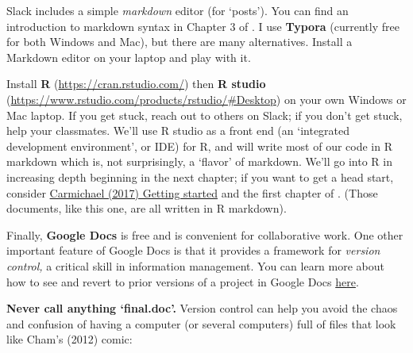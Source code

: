 \documentclass[openany]{book}
\begin{document}
Slack includes a simple \emph{markdown} editor (for `posts'). You can find an introduction to markdown syntax in Chapter 3 of \citet{freeman2017informatics}. I use \textbf{Typora} (currently free for both Windows and Mac), but there are many alternatives. Install a Markdown editor on your laptop and play with it.

Install \textbf{R} (\url{https://cran.rstudio.com/}) then \textbf{R studio} (\url{https://www.rstudio.com/products/rstudio/\#Desktop}) on your own Windows or Mac laptop. If you get stuck, reach out to others on Slack; if you don't get stuck, help your classmates. We'll use R studio as a front end (an `integrated development environment', or IDE) for R, and will write most of our code in R markdown which is, not surprisingly, a `flavor' of markdown. We'll go into R in increasing depth beginning in the next chapter; if you want to get a head start, consider \href{https://idc9.github.io/stor390/notes/getting_started/getting_started.html}{Carmichael (2017) Getting started} and the first chapter of \citet{wickham2016r}. (Those documents, like this one, are all written in R markdown).

Finally, \textbf{Google Docs} is free and is convenient for collaborative work. One other important feature of Google Docs is that it provides a framework for \emph{version control,} a critical skill in information management. You can learn more about how to see and revert to prior versions of a project in Google Docs \href{https://sites.google.com/site/scriptsexamples/home/announcements/named-versions-new-version-history-google-docs}{here}.

\textbf{Never call anything `final.doc'.} Version control can help you avoid the chaos and confusion of having a computer (or several computers) full of files that look like Cham's (2012) comic:
\end{document}
